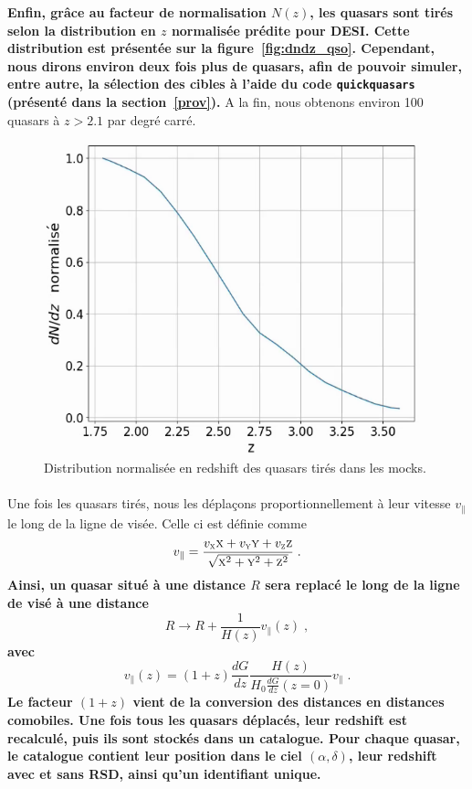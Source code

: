 \documentclass[11pt, twoside, a4paper, openright]{report}
\begin{document}
\textbf{Enfin, grâce au facteur de normalisation $N(z)$, les quasars sont tirés selon la distribution en $z$ normalisée prédite pour DESI. Cette distribution est présentée sur la figure~\ref{fig:dndz_qso}. Cependant, nous dirons environ deux fois plus de quasars, afin de pouvoir simuler, entre autre, la sélection des cibles à l'aide du code \texttt{quickquasars} (présenté dans la section~\ref{prov}).}
A la fin, nous obtenons environ \num{100} quasars à $z > \num{2.1}$ par degré carré.
\begin{figure}
  \centering
  \includegraphics[scale=0.5]{dndz_qso}
  \caption{Distribution normalisée en redshift des quasars tirés dans les mocks.}
\end{figure}

\paragraph{}
Une fois les quasars tirés, nous les déplaçons proportionnellement à leur vitesse $v_{\parallel}$ le long de la ligne de visée. Celle ci est définie comme
\begin{equation}
  v_{\parallel} = \frac{v_{\textsc{x}} \textsc{x} + v_{\textsc{y}} \textsc{y} + v_{\textsc{z}} \textsc{z}}{\sqrt{\textsc{x}^2 + \textsc{y}^2 + \textsc{z}^2}} \; .
\end{equation}
\textbf{Ainsi, un quasar situé à une distance $R$ sera replacé le long de la ligne de visé à une distance
\begin{equation}
 R \rightarrow  R + \frac{1}{H(z)} v_{\parallel}(z) \; ,  %
\end{equation}
avec
\begin{equation}
 v_{\parallel}(z) = (1+z) \frac{dG}{dz} \frac{H(z)}{H_0 \frac{dG}{dz}(z=0)} v_{\parallel} \; .
\end{equation}
Le facteur $(1+z)$ vient de la conversion des distances en distances comobiles. Une fois tous les quasars déplacés, leur redshift est recalculé, puis ils sont stockés dans un catalogue. Pour chaque quasar, le catalogue contient leur position dans le ciel $(\alpha, \delta)$, leur redshift avec et sans RSD, ainsi qu'un identifiant unique.}
\end{document}
